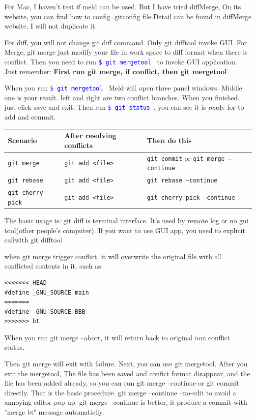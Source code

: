 \documentclass[paper=8.5in:11in, twoside, 12pt, pagesize=pdftex]{book}
\newcommand{\linuxcommand}[1]{\texttt{\textcolor{blue}{\$ #1 \Pisymbol{psy}{191}}}}
\begin{document}
	For Mac, I haven't test if meld can be used. But I have tried diffMerge, On its website, you can find how to config .gitconfig file.Detail can be found in diffMerge website. I will not duplicate it.
	
	For diff, you will not change git diff command. Only git difftool invoke GUI. For Merge, git merge just modify your file in work space to diff format when there is conflict. Then you need to run \linuxcommand{git mergetool} to invoke GUI application.  Just remember: \textbf{First run git merge, if conflict, then git mergetool}
	
	When you run \linuxcommand{git mergetool} Meld will open three panel windows. Middle one is your result. left and right are two conflict branches.  When you finished. just click save and exit. Then run \linuxcommand{git status}, you can see it is ready for to add and commit. 
	
\begin{tabular}{|l|l|l|}
	\hline
	\textbf{Scenario} & \textbf{After resolving conflicts} & \textbf{Then do this} \\
	\hline
	\texttt{git merge} & \texttt{git add <file>} & \texttt{git commit} or \texttt{git merge --continue} \\
	\hline
	\texttt{git rebase} & \texttt{git add <file>} & \texttt{git rebase --continue} \\
	\hline
	\texttt{git cherry-pick} & \texttt{git add <file>} & \texttt{git cherry-pick --continue} \\
	\hline
\end{tabular}
	
	The basic usage is: git diff is terminal interface. It's used by remote log or no gui tool(other people's computer). If you want to use GUI app, you need to explicit callwith git difftool
	
	when git merge trigger conflict, it will overwrite the original  file with all conflicted contents in it. such as
\begin{lstlisting}
<<<<<<< HEAD
#define _GNU_SOURCE main
=======
#define _GNU_SOURCE BBB
>>>>>>> bt
\end{lstlisting}
	When you run git merge --abort, it will return back to original non conflict status. 
	
	Then git merge will exit with failure. Next, you can use git mergetool. After you exit the mergetool, The file has been saved and confict format disappear, and the file has been added already, so you can run git merge --continue or git commit directly. That is the basic procedure. git merge --continue --no-edit to avoid a annoying editor pop up. git merge --continue is better, it produce a commit with "merge bt" message automaticlly.
	
\end{document}
